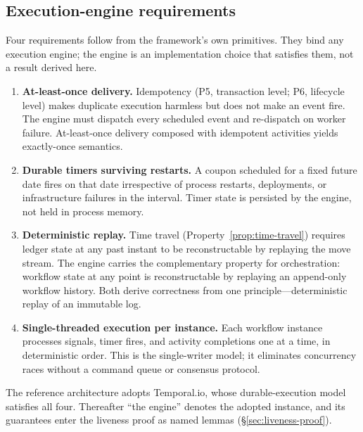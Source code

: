 \documentclass[11pt,a4paper]{article}
\begin{document}
\subsection{Execution-engine requirements}
\label{sec:exec-requirements}

Four requirements follow from the framework's own primitives. They bind any execution engine; the engine is an implementation choice that satisfies them, not a result derived here.

\begin{enumerate}[nosep]
\item \textbf{At-least-once delivery.} Idempotency (P5, transaction level; P6, lifecycle level) makes duplicate execution harmless but does not make an event fire. The engine must dispatch every scheduled event and re-dispatch on worker failure. At-least-once delivery composed with idempotent activities yields exactly-once semantics.

\item \textbf{Durable timers surviving restarts.} A coupon scheduled for a fixed future date fires on that date irrespective of process restarts, deployments, or infrastructure failures in the interval. Timer state is persisted by the engine, not held in process memory.

\item \textbf{Deterministic replay.} Time travel (Property~\ref{prop:time-travel}) requires ledger state at any past instant to be reconstructable by replaying the move stream. The engine carries the complementary property for orchestration: workflow state at any point is reconstructable by replaying an append-only workflow history. Both derive correctness from one principle---deterministic replay of an immutable log.

\item \textbf{Single-threaded execution per instance.} Each workflow instance processes signals, timer fires, and activity completions one at a time, in deterministic order. This is the single-writer model; it eliminates concurrency races without a command queue or consensus protocol.
\end{enumerate}

\noindent The reference architecture adopts Temporal.io, whose durable-execution model satisfies all four. Thereafter ``the engine'' denotes the adopted instance, and its guarantees enter the liveness proof as named lemmas (\S\ref{sec:liveness-proof}).
\end{document}
